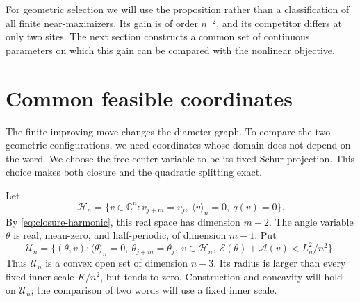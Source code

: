 \documentclass[11pt,reqno]{amsart}
\numberwithin{equation}{section}
\theoremstyle{definition}
\theoremstyle{remark}
\newcommand{\C}{\mathbb C}
\newcommand{\A}{\mathcal A}
\newcommand{\E}{\mathcal E}
\newcommand{\av}[1]{\langle #1\rangle_n}
\newcommand{\HH}{\mathcal H_n}
\newcommand{\UU}{\mathscr U_n}
\begin{document}
For geometric selection we will use the proposition rather than a classification of all finite near-maximizers. Its gain is of order $n^{-2}$, and its competitor differs at only two sites. The next section constructs a common set of continuous parameters on which this gain can be compared with the nonlinear objective.


\section{Common feasible coordinates}\label{sec:fibers}
The finite improving move changes the diameter graph. To compare the two geometric configurations, we need coordinates whose domain does not depend on the word. We choose the free center variable to be its fixed Schur projection. This choice makes both closure and the quadratic splitting exact.

Let
\[
 \HH=\{v\in\C^n:v_{j+m}=v_j,\ \av v=0,\ q(v)=0\}.
\]
By \eqref{eq:closure-harmonic}, this real space has dimension $m-2$. The angle variable $\theta$ is real, mean-zero, and half-periodic, of dimension $m-1$. Put
\begin{equation}\label{eq:fiber-domain}
 \UU=\{(\theta,v):\av\theta=0,\ \theta_{j+m}=\theta_j,
                 \ v\in\HH,\ \E(\theta)+\A(v)<L_n^2/n^2\}.
\end{equation}
Thus $\UU$ is a convex open set of dimension $n-3$. Its radius is larger than every fixed inner scale $K/n^2$, but tends to zero. Construction and concavity will hold on $\UU$; the comparison of two words will use a fixed inner scale.
\end{document}

